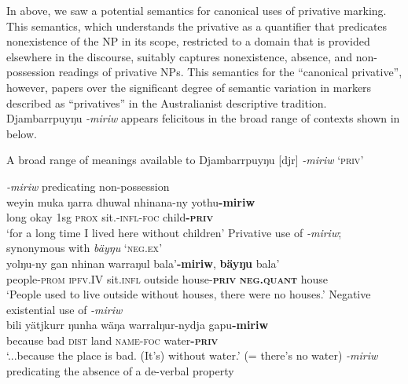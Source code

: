 \documentclass[output=paper,draft,draftmode,colorlinks,citecolor=brown]{langscibook}
\begin{document}
In  above, we saw a potential semantics for canonical uses of privative marking. This semantics, which understands the privative as a quantifier that predicates nonexistence of the NP in its scope, restricted to a domain that is provided elsewhere in the discourse, suitably captures nonexistence, absence, and non-possession readings of privative \textsc{NP}s. This semantics for the ``canonical privative'', however, papers over the significant degree of semantic variation in markers described as ``privatives'' in the Australianist descriptive tradition. Djambarrpuyŋu \textit{-miriw} appears felicitous in the broad range of contexts shown in  below.
\begin{exe}\ex\label{ex:austr-djamb-range}
    A broad range of meanings available to 
    Djambarrpuyŋu [djr] \textit{-miriw} `\textsc{priv}'
    \begin{xlist}
\ex \emph{-miriw} predicating non-possession\\
\gll weyin muka ŋarra dhuwal nhinana-ny yothu\textbf{-miriw}\\
long okay 1sg \textsc{prox} sit.\textsc{-infl}-\textsc{foc} child\textsc{\textbf{-priv}}\\
\glt `for a long time I lived here without children'\citep[445]{Wilkinson1991}
%
\ex Privative use of \emph{-miriw}; synonymous with \emph{bäyŋu} `\textsc{neg.ex}'\\
\gll yolŋu-ny gan nhinan warraŋul bala'\textbf{-miriw}, \textbf{bäyŋu} bala'\\
people-\textsc{prom} \textsc{ipfv.IV} sit\textsc{.infl} outside house\textsc{-\textbf{priv}} \textsc{\textbf{neg.quant}} house\\
\glt  `People used to live outside without houses, there were no houses.'\citep[443]{Wilkinson1991}
%
\ex Negative existential use of \emph{-miriw}\\
\gll bili yätjkurr ŋunha wäŋa warralŋur-nydja gapu\textbf{-miriw}\\
because bad \textsc{dist} land \textsc{name-foc} water\textsc{\textbf{-priv}}\\
\glt  `...because the place is bad. (It's) without water.' (= there's no water)\citep[443]{Wilkinson1991}
%
    \ex\label{ex:austr-djamb-range-sleep} 
    \emph{-miriw} predicating the absence of a de-verbal property\\

\end{xlist}
\end{exe}
\end{document}

